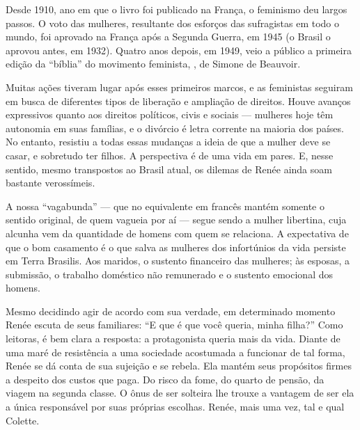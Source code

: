 \begin{multicols}{2}
\bigskip

{\small{}}

\bigskip

Desde 1910, ano em que o livro foi publicado na França, o feminismo deu largos passos. O voto das mulheres, resultante dos esforços das sufragistas em todo o mundo, foi aprovado na França após a Segunda Guerra, em 1945 (o Brasil o aprovou antes, em 1932). Quatro anos depois, em 1949, veio a público a primeira edição da “bíblia” do movimento feminista, {}, de Simone de Beauvoir.

Muitas ações tiveram lugar após esses primeiros marcos, e as feministas seguiram em busca de diferentes tipos de liberação e ampliação de direitos. Houve avanços expressivos quanto aos direitos políticos, civis e sociais --- mulheres hoje têm autonomia em suas famílias, e o divórcio é letra corrente na maioria dos países. No entanto, resistiu a todas essas mudanças a ideia de que a mulher deve se casar, e sobretudo ter filhos. A perspectiva é de uma vida em pares. E, nesse sentido, mesmo transpostos ao Brasil atual, os dilemas de Renée ainda soam bastante verossímeis. 

A nossa “vagabunda” --- que no equivalente em francês {} mantém somente o sentido original, de quem vagueia por aí --- segue sendo a mulher libertina, cuja alcunha vem da quantidade de homens com quem se relaciona. A expectativa de que o bom casamento é o que salva as mulheres dos infortúnios da vida persiste em Terra Brasilis. Aos maridos, o sustento financeiro das mulheres; às esposas, a submissão, o trabalho doméstico não remunerado e o sustento emocional dos homens.

Mesmo decidindo agir de acordo com sua verdade, em determinado momento Renée escuta de seus familiares: “E que é que você queria, minha filha?” Como leitoras, é bem clara a resposta: a protagonista queria mais da vida. Diante de uma maré de resistência a uma sociedade acostumada a funcionar de tal forma, Renée se dá conta de sua sujeição e se rebela. Ela mantém seus propósitos firmes a despeito dos custos que paga. Do risco da fome, do quarto de pensão, da viagem na segunda classe. O ônus de ser solteira lhe trouxe a vantagem de ser ela a única responsável por suas próprias escolhas. Renée, mais uma vez, tal e qual Colette. 


\end{multicols}
